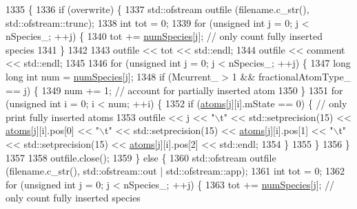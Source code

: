 \begin{DoxyCode}
1335                                                                                     \{
1336     \textcolor{keywordflow}{if} (overwrite) \{
1337         std::ofstream outfile (filename.c\_str(), std::ofstream::trunc);
1338         \textcolor{keywordtype}{int} tot = 0;
1339         \textcolor{keywordflow}{for} (\textcolor{keywordtype}{unsigned} \textcolor{keywordtype}{int} j = 0; j < nSpecies\_; ++j) \{
1340             tot += \hyperlink{classsim_system_a9eea865e6dc1cff377b1e79c4d9c23f0}{numSpecies}[j]; \textcolor{comment}{// only count fully inserted species}
1341         \}
1342 
1343         outfile << tot << std::endl;
1344         outfile << comment << std::endl;
1345 
1346         \textcolor{keywordflow}{for} (\textcolor{keywordtype}{unsigned} \textcolor{keywordtype}{int} j = 0; j < nSpecies\_; ++j) \{
1347             \textcolor{keywordtype}{long} \textcolor{keywordtype}{long} \textcolor{keywordtype}{int} num = \hyperlink{classsim_system_a9eea865e6dc1cff377b1e79c4d9c23f0}{numSpecies}[j];
1348             \textcolor{keywordflow}{if} (Mcurrent\_ > 1 && fractionalAtomType\_ == j) \{
1349                 num += 1; \textcolor{comment}{// account for partially inserted atom}
1350             \}
1351             \textcolor{keywordflow}{for} (\textcolor{keywordtype}{unsigned} \textcolor{keywordtype}{int} i = 0; i < num; ++i) \{
1352                 \textcolor{keywordflow}{if} (\hyperlink{classsim_system_a90421b19082f7fb8fc23b7264b1161e4}{atoms}[j][i].mState == 0) \{ \textcolor{comment}{// only print fully inserted atoms}
1353                     outfile << j << \textcolor{stringliteral}{"\(\backslash\)t"} <<  std::setprecision(15) << \hyperlink{classsim_system_a90421b19082f7fb8fc23b7264b1161e4}{atoms}[j][i].pos[0] << \textcolor{stringliteral}{"\(\backslash\)t"} << 
      std::setprecision(15) << \hyperlink{classsim_system_a90421b19082f7fb8fc23b7264b1161e4}{atoms}[j][i].pos[1] << \textcolor{stringliteral}{"\(\backslash\)t"} << std::setprecision(15) << 
      \hyperlink{classsim_system_a90421b19082f7fb8fc23b7264b1161e4}{atoms}[j][i].pos[2] << std::endl;
1354                 \}
1355             \}
1356         \}
1357 
1358         outfile.close();
1359     \} \textcolor{keywordflow}{else} \{
1360         std::ofstream outfile (filename.c\_str(), std::ofstream::out | std::ofstream::app);
1361         \textcolor{keywordtype}{int} tot = 0;
1362         \textcolor{keywordflow}{for} (\textcolor{keywordtype}{unsigned} \textcolor{keywordtype}{int} j = 0; j < nSpecies\_; ++j) \{
1363             tot += \hyperlink{classsim_system_a9eea865e6dc1cff377b1e79c4d9c23f0}{numSpecies}[j]; \textcolor{comment}{// only count fully inserted species}

\end{DoxyCode}
